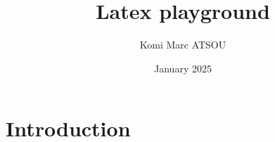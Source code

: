 \documentclass{article}
\title{Latex playground}
\author{Komi Marc ATSOU}
\date{January 2025}
\begin{document}
\maketitle

\section{Introduction}
\end{document}
